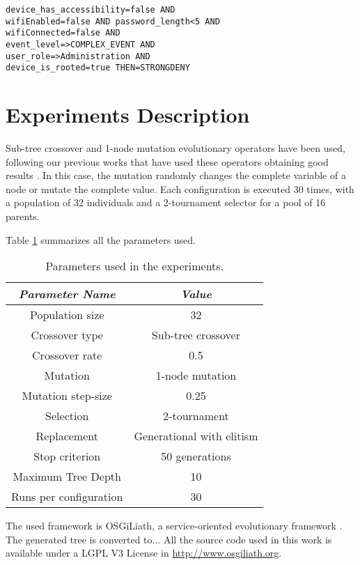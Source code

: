 \documentclass[a4paper,10pt,twocolumn,preprint,3p]{elsarticle}
\begin{document}
\begin{verbatim}
device_has_accessibility=false AND
wifiEnabled=false AND password_length<5 AND
wifiConnected=false AND
event_level=>COMPLEX_EVENT AND
user_role=>Administration AND
device_is_rooted=true THEN=STRONGDENY
\end{verbatim}


\section{Experiments Description}
\label{sec:experiments}

Sub-tree crossover and 1-node mutation evolutionary operators have been used, following our previous works that have used these operators obtaining good results \cite{EvoStar2014:GPBot}. In this case, the mutation randomly changes the complete variable of a node or mutate the complete value. Each configuration is executed 30 times, with a population of 32 individuals and a 2-tournament selector for a pool of 16 parents.


Table \ref{tab:parameters} summarizes all the parameters used.

\begin{table}
\begin{center}
\begin{tabular}{|c|c|}
\hline
{\em Parameter Name} & {\em Value} \\\hline
Population size & 32 \\\hline
Crossover type & Sub-tree crossover \\ \hline
Crossover rate & 0.5\\ \hline
Mutation  & 1-node mutation\\ \hline
Mutation step-size & 0.25 \\ \hline
Selection & 2-tournament \\ \hline
Replacement & Generational with elitism\\ \hline
Stop criterion & 50 generations \\ \hline
Maximum Tree Depth & 10 \\ \hline %
Runs per configuration & 30 \\ \hline
\end{tabular}
\caption{Parameters used in the experiments.}
\label{tab:parameters}
\end{center}
\end{table}

The used framework is OSGiLiath, a service-oriented evolutionary
framework \cite{DBLP:journals/soco/Garcia-SanchezGCAG13}. The
generated tree is converted to...  All the source code used in this
work is available under a LGPL V3 License in
\url{http://www.osgiliath.org}. 
\end{document}

